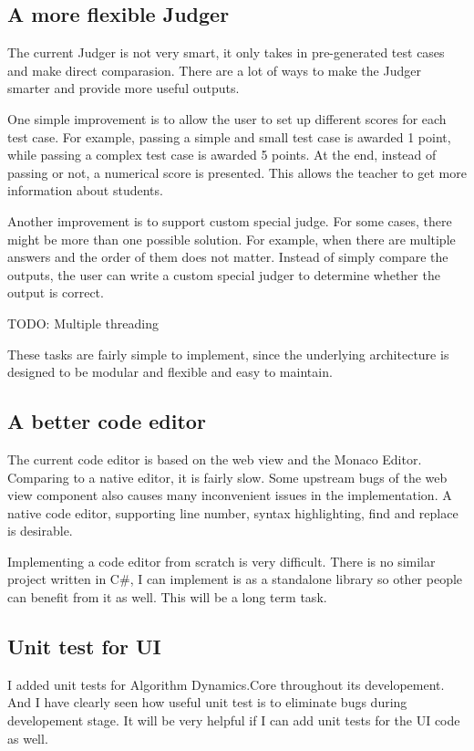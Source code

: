 \documentclass[a4paper]{report}
\begin{document}
\subsection{A more flexible Judger}

The current Judger is not very smart, it only takes in pre-generated test cases and make direct comparasion. There are a lot of ways to make the Judger smarter and provide more useful outputs.

One simple improvement is to allow the user to set up different scores for each test case. For example, passing a simple and small test case is awarded 1 point, while passing a complex test case is awarded 5 points. At the end, instead of passing or not, a numerical score is presented. This allows the teacher to get more information about students.

Another improvement is to support custom special judge. For some cases, there might be more than one possible solution. For example, when there are multiple answers and the order of them does not matter. Instead of simply compare the outputs, the user can write a custom special judger to determine whether the output is correct.

TODO: Multiple threading

These tasks are fairly simple to implement, since the underlying architecture is designed to be modular and flexible and easy to maintain.

\subsection{A better code editor}

The current code editor is based on the web view and the Monaco Editor. Comparing to a native editor, it is fairly slow. Some upstream bugs of the web view component also causes many inconvenient issues in the implementation. A native code editor, supporting line number, syntax highlighting, find and replace is desirable.

Implementing a code editor from scratch is very difficult. There is no similar project written in C\#, I can implement is as a standalone library so other people can benefit from it as well. This will be a long term task.

\subsection{Unit test for UI}

I added unit tests for Algorithm Dynamics.Core throughout its developement. And I have clearly seen how useful unit test is to eliminate bugs during developement stage. It will be very helpful if I can add unit tests for the UI code as well.
\end{document}
